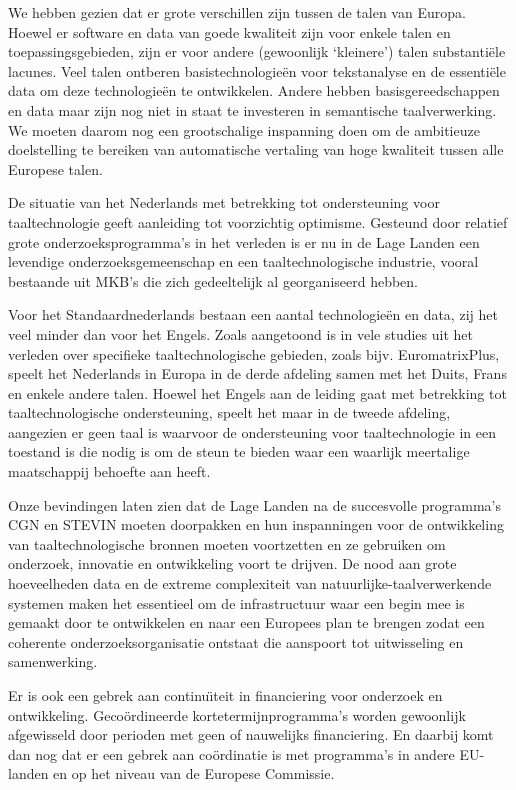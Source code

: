\begin{multicols}{2}
    We hebben gezien dat er grote verschillen zijn tussen de talen van Europa. Hoewel er software en data van goede kwaliteit zijn voor enkele talen en toepassingsgebieden, zijn er voor andere (gewoonlijk `kleinere') talen substanti{\"e}le lacunes. Veel talen ontberen basistechnologie{\"e}n voor tekstanalyse en de essenti{\"e}le data om deze technologie{\"e}n te ontwikkelen. Andere hebben basisgereedschappen en data maar zijn nog niet in staat te investeren in semantische taalverwerking. We moeten daarom nog een grootschalige inspanning doen om de ambitieuze doelstelling te bereiken van automatische vertaling van hoge kwaliteit tussen alle Europese talen.

    De situatie van het Nederlands met betrekking tot ondersteuning voor taaltechnologie geeft aanleiding tot voorzichtig optimisme. Gesteund door relatief grote onderzoeksprogramma's in het verleden is er nu in de Lage Landen een levendige onderzoeksgemeenschap en een taaltechnologische industrie, vooral bestaande uit MKB's die zich gedeeltelijk al georganiseerd hebben.

    Voor het Standaardnederlands bestaan een aantal technologie{\"e}n en data, zij het veel minder dan voor het Engels. Zoals aangetoond is in vele studies uit het verleden over specifieke taaltechnologische gebieden, zoals bijv. EuromatrixPlus, speelt het Nederlands in Europa in de derde afdeling samen met het Duits, Frans en enkele andere talen. Hoewel het Engels aan de leiding gaat met betrekking tot taaltechnologische ondersteuning, speelt het  maar in de tweede afdeling, aangezien er geen taal is waarvoor de ondersteuning voor taaltechnologie  in een toestand is die nodig is om de steun te bieden waar een waarlijk meertalige maatschappij behoefte aan heeft.

    Onze bevindingen laten zien dat de Lage Landen na de succesvolle programma's CGN en STEVIN moeten doorpakken en hun inspanningen voor de ontwikkeling van taaltechnologische bronnen moeten voortzetten en ze gebruiken om onderzoek, innovatie en ontwikkeling voort te drijven. De nood aan grote hoeveelheden data en de extreme complexiteit van natuurlijke-taalverwerkende systemen maken het essentieel om de infrastructuur waar een begin mee is gemaakt door te ontwikkelen en naar een Europees plan te brengen zodat een coherente onderzoeksorganisatie ontstaat die aanspoort tot uitwisseling en samenwerking.

    Er is ook een gebrek aan continu{\"\i}teit in financiering voor onderzoek en ontwikkeling. Geco{\"o}rdineerde kortetermijnprogramma's worden gewoonlijk afgewisseld door perioden met geen of nauwelijks financiering. En daarbij komt dan nog dat er een gebrek aan co{\"o}rdinatie is met programma's in andere EU-landen en op het niveau van de Europese Commissie.


\end{multicols}
